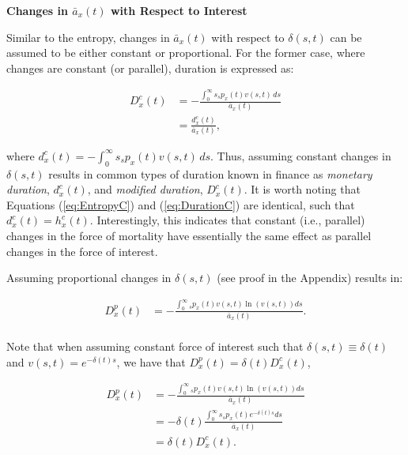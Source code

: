 \documentclass[12pt]{article}
\begin{document}
{\textbf{{Changes in $\bar{a}_x(t)$ with Respect to Interest}}


Similar to the entropy, changes in $\bar{a}_x(t)$ with respect to $\delta(s,t)$ can be assumed to be either constant or proportional. For the former case, where changes are constant (or parallel), duration is expressed as:

\begin{equation}\label{eq:DurationC}
	\begin{split}
		{D}^{c}_x(t) &= -\frac{\int_0^\infty s {}_s p_x(t) {v}(s,t) \, ds}{\bar{a}_x(t)} \\
		&= \frac{{d}^{c}_x(t)}{\bar{a}_x(t)},
	\end{split}
\end{equation}

where ${d}^{c}_x(t) = -\int_0^\infty s {}_s p_x(t) {v}(s,t) \, ds$. Thus, assuming constant changes in $\delta(s,t)$ results in common types of duration known in finance as \textit{monetary duration}, ${d}^{c}_x(t)$, and \textit{modified duration}, ${D}^{c}_x(t)$. It is worth noting that Equations (\ref{eq:EntropyC}) and (\ref{eq:DurationC}) are identical, such that ${d}^{c}_x(t) = {h}^{c}_{x}(t)$. Interestingly, this indicates that constant (i.e., parallel) changes in the force of mortality have essentially the same effect as parallel changes in the force of interest.

Assuming proportional changes in $\delta(s,t)$ (see proof in the Appendix) results in: 


\begin{equation}\label{eq:DurationP}
\begin{split}
{D}^{p}_{x}(t) &= -\frac{\int_0^\infty {}_sp_x(t) v(s,t) \ln(v(s,t))ds}{\bar{a}_x(t)}. \\
\end{split}
\end{equation}


Note that when assuming constant force of interest such that $\delta(s,t) \equiv \delta(t)$ and $v(s,t)=e^{-\delta(t)s}$, we have that ${D}^{p}_{x}(t)=\delta(t){D}^{c}_{x}(t)$,


\begin{equation}\label{eq:DurationCP}
\begin{split}
{D}^{p}_{x}(t) &= -\frac{\int_0^\infty {}_sp_x(t) v(s,t) \ln(v(s,t))ds}  {\bar{a}_x(t)} \\
&=- \delta(t)\frac{\int_0^\infty s{}_sp_x(t) e^{-\delta(t)s}  ds}{\bar{a}_x(t)} \\
& = \delta(t){D}^{c}_{x}(t).
\end{split}
\end{equation}

}
\end{document}
